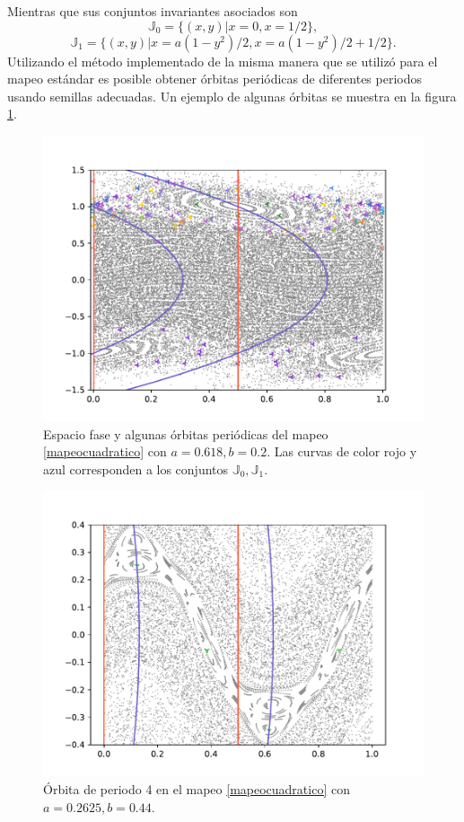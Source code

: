 Mientras que sus conjuntos invariantes asociados son
\begin{equation}
	\mathbb{J}_{0} = \{ (x,y) | x=0 ,x=1/2\},
	\label{conjunto invariante cuadratico 0}
\end{equation}
\begin{equation}	
	\mathbb{J}_{1} = \{ (x,y)| x= a(1-y^{2})/2, x = a(1-y^{2})/2+1/2
		\}.
	\label{conjunto invariante cuadratico 1}
\end{equation}
Utilizando el m\'etodo implementado de la misma manera que se utiliz\'o para el mapeo est\'andar es posible obtener \'orbitas peri\'odicas de diferentes periodos usando semillas adecuadas. Un ejemplo de algunas \'orbitas se muestra en la figura \ref{orbitasmapeocuadraticov}. \\

\begin{figure}[H]
	\includegraphics[scale=0.7]{MapeoCuadraDifP}
	\caption{Espacio fase y algunas \'orbitas peri\'odicas del mapeo \eqref{mapeocuadratico} con $ a = 0.618, b=0.2$. Las curvas de color rojo y azul corresponden a los conjuntos $\mathbb{J}_{0}, \mathbb{J}_{1}$.}
	\label{orbitasmapeocuadraticov}
\end{figure}
\begin{figure}
	\centering
	\includegraphics[scale=0.6]{MApeoCP4A}
	\caption{\'Orbita de periodo 4 en el mapeo \eqref{mapeocuadratico} con $a = 0.2625, b = 0.44$.}
	\label{grafmapeocuadraper4}
\end{figure}

